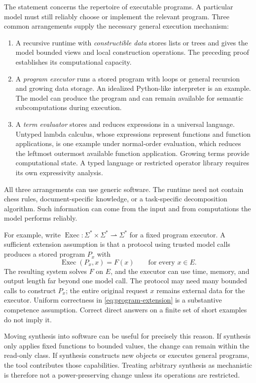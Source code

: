 \documentclass[11pt,twoside]{article}
\theoremstyle{definition}
\theoremstyle{remark}
\begin{document}
The statement concerns the repertoire of executable programs. A particular
model must still reliably choose or implement the relevant program. Three
common arrangements supply the necessary general execution mechanism:
\begin{enumerate}[leftmargin=*]
\item A recursive runtime with \emph{constructible data} stores lists or
trees and gives the model bounded views and local construction operations.
The preceding proof establishes its computational capacity.
\item A \emph{program executor} runs a stored program with loops or general
recursion and growing data storage. An idealized Python-like interpreter
is an example. The model can produce the program and can remain available
for semantic subcomputations during execution.
\item A \emph{term evaluator} stores and reduces expressions in a universal
language. Untyped lambda calculus, whose expressions represent functions
and function applications, is one example under normal-order evaluation,
which reduces the leftmost outermost available function application.
Growing terms provide computational state. A typed language or restricted
operator library requires its own expressivity analysis.
\end{enumerate}
All three arrangements can use generic software. The runtime need not
contain chess rules, document-specific knowledge, or a task-specific
decomposition algorithm. Such information can come from the input and
from computations the model performs reliably.

For example, write
$\operatorname{Exec}:\Sigma^*\times\Sigma^*\rightharpoonup\Sigma^*$ for a
fixed program executor. A sufficient extension assumption is that a
protocol using trusted model calls produces a stored program $P_x$ with
\begin{equation}
 \operatorname{Exec}(P_x,x)=F(x)\qquad\text{for every }x\in E.
 \label{eq:program-extension}
\end{equation}
The resulting system solves $F$ on $E$, and the executor can use time,
memory, and output length far beyond one model call. The protocol may need
many bounded calls to construct $P_x$; the entire original request $x$
remains external data for the executor. Uniform correctness in
\eqref{eq:program-extension} is a substantive competence assumption.
Correct direct answers on a finite set of short examples do not imply it.

Moving synthesis into software can be useful for precisely this reason.
If synthesis only applies fixed functions to bounded values, the change
can remain within the read-only class. If synthesis constructs new objects
or executes general programs, the tool contributes those capabilities.
Treating arbitrary synthesis as mechanistic is therefore not a
power-preserving change unless its operations are restricted.
\end{document}
